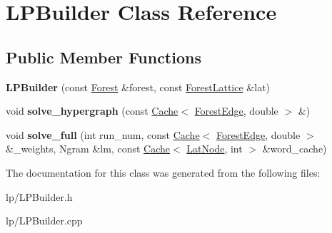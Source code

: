 \hypertarget{classLPBuilder}{
\section{LPBuilder Class Reference}
\label{classLPBuilder}
}
\subsection*{Public Member Functions}
\begin{DoxyCompactItemize}
\item 
\hypertarget{classLPBuilder_a6fc749a0e23ad5ebe94e23d12b2888e3}{
{\bfseries LPBuilder} (const \hyperlink{classForest}{Forest} \&forest, const \hyperlink{classForestLattice}{ForestLattice} \&lat)}
\label{classLPBuilder_a6fc749a0e23ad5ebe94e23d12b2888e3}

\item 
\hypertarget{classLPBuilder_a35d81f0ae30bcb7b28c3ff134052f146}{
void {\bfseries solve\_\-hypergraph} (const \hyperlink{classCache}{Cache}$<$ \hyperlink{classForestEdge}{ForestEdge}, double $>$ \&)}
\label{classLPBuilder_a35d81f0ae30bcb7b28c3ff134052f146}

\item 
\hypertarget{classLPBuilder_a4d3daca6b7e154293be44d0f5f514832}{
void {\bfseries solve\_\-full} (int run\_\-num, const \hyperlink{classCache}{Cache}$<$ \hyperlink{classForestEdge}{ForestEdge}, double $>$ \&\_\-weights, Ngram \&lm, const \hyperlink{classCache}{Cache}$<$ \hyperlink{classLatNode}{LatNode}, int $>$ \&word\_\-cache)}
\label{classLPBuilder_a4d3daca6b7e154293be44d0f5f514832}

\end{DoxyCompactItemize}


The documentation for this class was generated from the following files:\begin{DoxyCompactItemize}
\item 
lp/LPBuilder.h\item 
lp/LPBuilder.cpp\end{DoxyCompactItemize}
